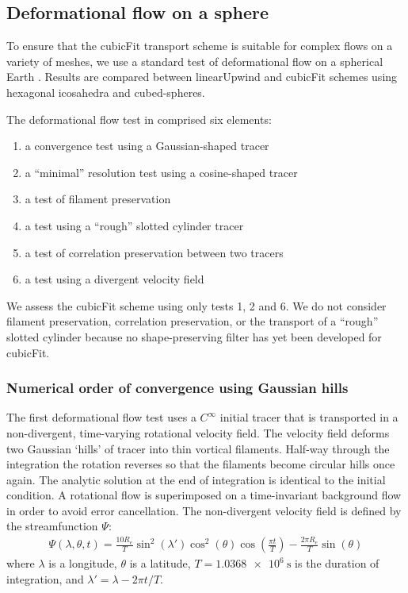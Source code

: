 \subsection{Deformational flow on a sphere}
To ensure that the cubicFit transport scheme is suitable for complex flows on a variety of meshes, we use a standard test of deformational flow on a spherical Earth \citep{lauritzen2012}.  
Results are compared between linearUpwind and cubicFit schemes using hexagonal icosahedra and cubed-spheres.

The deformational flow test in \citep{lauritzen2012} comprised six elements:
\begin{enumerate}
\item a convergence test using a Gaussian-shaped tracer
\item a ``minimal'' resolution test using a cosine-shaped tracer
\item a test of filament preservation
\item a test using a ``rough'' slotted cylinder tracer
\item a test of correlation preservation between two tracers
\item a test using a divergent velocity field
\end{enumerate}
We assess the cubicFit scheme using only tests 1, 2 and 6.  We do not consider filament preservation, correlation preservation, or the transport of a ``rough'' slotted cylinder because no shape-preserving filter has yet been developed for cubicFit.



\subsubsection{Numerical order of convergence using Gaussian hills}
\label{sec:deformationSphere-gaussian-nondiv}

The first deformational flow test uses a $C^\infty$ initial tracer that is transported in a non-divergent, time-varying rotational velocity field.
The velocity field deforms two Gaussian `hills' of tracer into thin vortical filaments.  Half-way through the integration the rotation reverses so that the filaments become circular hills once again.  The analytic solution at the end of integration is identical to the initial condition.
A rotational flow is superimposed on a time-invariant background flow in order to avoid error cancellation.
The non-divergent velocity field is defined by the streamfunction $\Psi$:
\begin{align}
	\Psi(\lambda, \theta, t) = \frac{10 R_e}{T} \sin^2 \left(\lambda'\right) \cos^2 \left(\theta\right) \cos \left( \frac{\pi t}{T} \right) - \frac{2 \pi R_e}{T} \sin\left(\theta\right)
\end{align}
where $\lambda$ is a longitude, $\theta$ is a latitude, $T = \SI{1.0368e6}{\second}$ is the duration of integration, and $\lambda' = \lambda - 2 \pi t / T$.

